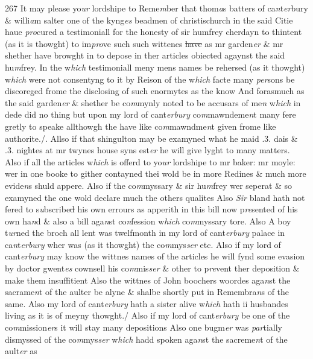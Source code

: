 \documentclass[12pt, a4paper]{book}
\begin{document}
{\color{Mahogany}267} It may please yo\textit{ur} lordshipe to Reme\textit{m}ber that thom\textit{a}s batters of ca\textit{n}t\textit{er}bury \& willi\textit{a}m salter one of the kyng\textit{es} beadmen of christischurch in the said Citie haue \textit{pro}cured a testimoniall for the honesty of sir humfrey cherdayn to thintent (as it is thowght) to im\textit{pro}ve such such wittenes \sout{have} as mr garden\textit{er} \& mr shether have browght in to depose in ther articles obiected agaynst the said hu\textit{m}frey. In the w\textit{hich} testimoniall meny mens
			 names be rehersed (as it thowght) w\textit{hich} were not consentyng to it by Reison of the w\textit{hich} facte many \textit{per}sons be discoreged frome the disclosing of such enormytes as the know And forasmuch as the said garden\textit{er} \& shether be co\textit{m}mynly noted to be accusars of me\textit{n} w\textit{hich} in dede did no thing but upon my lord of cant\textit{erbury} co\textit{m}mawndeme\textit{n}t many fere gretly to speake allthowgh the have like co\textit{m}mawndme\textit{n}t given frome like authorite./.   Allso if that shingulton may be examyned what he maid .3. dais \& .3. nightes at  mr twynes house syns est\textit{er} he will give lyght to many matters. Also if all the articles w\textit{hich} is offerd to yo\textit{ur} lordshipe to mr baker: mr moyle: wer in one booke to gither contayned thei wold be in more Redines \& much more evide\textit{n}s shuld appere. Also if the co\textit{m}myssary \& sir hu\textit{m}frey wer seperat \& so examyned the one wold declare much the others qualites Also \textit{Sir} bland hath not fered to s\textit{u}bscribe\sout{d} his own errours as apperith in this bill now p\textit{re}sented of his own ha\textit{n}d \& also a bill aga\textit{n}st co\textit{n}fession w\textit{hich} co\textit{m}myssary tore. Also A boy t\textit{ur}ned the broch all lent was twelfmonth in my lord of cant\textit{erbury} palace in ca\textit{n}t\textit{erbury} wher was (as it thowght) the co\textit{m}mys\textit{ser} etc.  Also if my lord of cant\textit{erbury} may know the wittnes names of the articles he will fynd some evasion by doctor gwent\textit{es} cownsell his co\textit{m}mis\textit{ser} \& other to p\textit{re}vent ther deposition \& make them insuffitient Also the wittnes of John boochers woordes aga\textit{n}st the sacrame\textit{n}t of the aulter be  alyne \& shalbe shortly put in Remembra\textit{n}s of the same. Also my lord of cant\textit{erbury} hath a sister alive w\textit{hich} hath ii husbandes living as it is
			 of meyny thowght./ Also if my lord of cant\textit{erbury} be one of the co\textit{m}mission\textit{er}s it will stay many depositions Also one bugm\textit{er} was\textit{ par}tially dismyssed of the co\textit{m}mys\textit{ser} w\textit{hich} hadd spoken aga\textit{n}st the sacreme\textit{n}t of the ault\textit{er} as \textit{}
               
\end{document}
